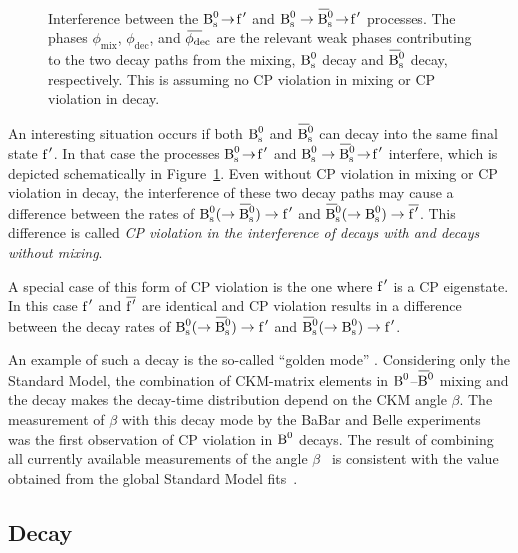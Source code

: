 \newcommand{\ffig}{\fp}
\newcommand{\phimixfig}{\phi_\text{mix}}
\newcommand{\phifig}{\phi_\text{dec}}
\newcommand{\phibarfig}{\kern 0.15em \overline{\kern -0.15em \phi_\text{dec} \kern -0.60em} \kern 0.60em}
\begin{figure}[tb]
  \centering
  \resizebox{0.32\textwidth}{!}{}
  \caption{Interference between the $\Bstof[\fp]$ and $\Bs\to\Bsbartof[\fp]$ processes. The phases $\phimixfig$, $\phifig$, and
           $\phibarfig$ are the relevant weak phases contributing to the two decay paths from the mixing, $\Bs$ decay and $\Bsbar$ decay,
           respectively. This is assuming no CP violation in mixing or CP violation in decay.}
  \label{fig:interference}
\end{figure}

An interesting situation occurs if both $\Bs$ and $\Bsbar$ can decay into the same final state $\fp$. In that case the processes
$\Bstof[\fp]$ and $\Bs\to\Bsbartof[\fp]$ interfere, which is depicted schematically in Figure~\ref{fig:interference}. Even without CP
violation in mixing or CP violation in decay, the interference of these two decay paths may cause a difference between the rates of
$\Bs(\to\Bsbar)\to\fp$ and $\Bsbar(\to\Bs)\to\overline{\fp}$. This difference is called \emph{CP violation in the interference of decays
with and decays without mixing}.

A special case of this form of CP violation is the one where $\fp$ is a CP eigenstate. In this case $\fp$ and $\overline{\fp}$ are
identical and CP violation results in a difference between the decay rates of $\Bs(\to\Bsbar)\to\fp$ and $\Bsbar(\to\Bs)\to\fp$.

An example of such a decay is the so-called ``golden mode'' \BdtoJpsiKS. Considering only the Standard Model, the combination of CKM-matrix
elements in $\Bd$--$\Bdbar$ mixing and the \BdtoJpsiKS{} decay makes the decay-time distribution depend on the CKM angle $\beta$. The
measurement of $\beta$ with this decay mode by the BaBar and Belle experiments~\cite{Aubert:2001nu,*Abe:2001xe} was the first observation
of CP violation in $\Bd$ decays. The result of combining all currently available measurements of the angle $\beta$~\cite{Amhis:2012bh} is
consistent with the value obtained from the global Standard Model fits~\cite{Charles:2004jd,Bona:2005vz}.


\subsection{\texorpdfstring{\BstoJpsiphi{}}{Bs0->Jpsiphi} Decay}
\label{subsec:intro_Jpsiphi_decay}

